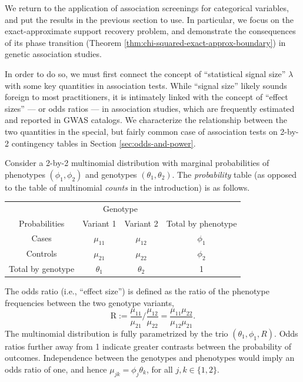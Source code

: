 
We return to the application of association screenings for categorical variables, and put the results in the previous section to use.
In particular, we focus on the exact-approximate support recovery problem, and demonstrate the consequences of its phase transition (Theorem \ref{thm:chi-squared-exact-approx-boundary}) in genetic association studies.

In order to do so, we must first connect the concept of ``statistical signal size'' $\lambda$ with some key quantities in association tests.
While ``signal size'' likely sounds foreign to most practitioners, it is intimately linked with the concept of ``effect sizes'' --- or odds ratios --- in association studies, which are frequently estimated and reported in GWAS catalogs.
We characterize the relationship between the two quantities in the special, but fairly common case of association tests on 2-by-2 contingency tables in Section \ref{sec:odds-and-power}.


Consider a 2-by-2 multinomial distribution with marginal probabilities of phenotypes $(\phi_1, \phi_2)$ and genotypes $(\theta_1, \theta_2)$.
The \emph{probability} table (as opposed to the table of multinomial \emph{counts} in the introduction) is as follows.
\begin{center}
    \begin{tabular}{cccc}
    \hline
    & \multicolumn{2}{c}{Genotype} \\
    \cline{2-3}
    Probabilities & Variant 1 & Variant 2 & Total by phenotype \\
    \hline
    Cases & $\mu_{11}$ & $\mu_{12}$ & $\phi_1$ \\
    Controls & $\mu_{21}$ & $\mu_{22}$ & $\phi_2$ \\
    Total by genotype & $\theta_1$ & $\theta_2$ & 1 \\
    \hline
    \end{tabular}
\end{center}
The odds ratio (i.e., ``effect size'') is defined as the ratio of the phenotype frequencies between the two genotype variants,
\begin{equation} \label{eq:odds-ratio}
    \text{R} := \frac{\mu_{11}}{\mu_{21}}\Big/\frac{\mu_{12}}{\mu_{22}}
    = \frac{\mu_{11}\mu_{22}}{\mu_{12}\mu_{21}}.
\end{equation}
The multinomial distribution is fully parametrized by the trio $(\theta_1, \phi_1, R)$.
Odds ratios further away from 1 indicate greater contrasts between the probability of outcomes.
Independence between the genotypes and phenotypes would imply an odds ratio of one, and hence $\mu_{jk} = \phi_j\theta_k$, for all $j,k \in\{1,2\}$.

